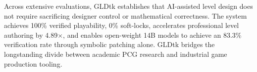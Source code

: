 \documentclass[11pt,a4paper]{report}
\theoremstyle{definition}
\theoremstyle{remark}
\begin{document}
Across extensive evaluations, GLDtk establishes that AI-assisted level design does not require sacrificing designer control or mathematical correctness. The system achieves 100\% verified playability, 0\% soft-locks, accelerates professional level authoring by 4.89$\times$, and enables open-weight 14B models to achieve an 83.3\% verification rate through symbolic patching alone. GLDtk bridges the longstanding divide between academic PCG research and industrial game production tooling.



\end{document}
